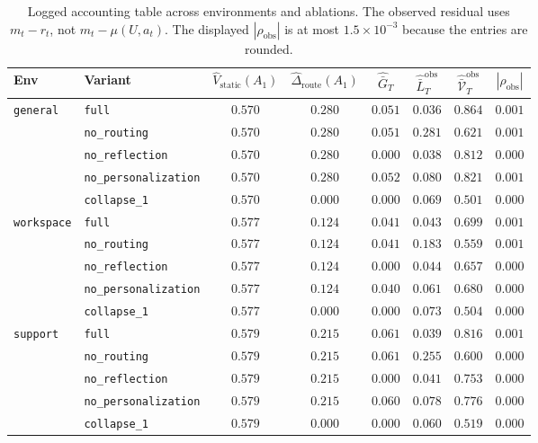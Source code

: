 \documentclass{article} %
\begin{document}
\begin{table}[h]
\centering
\small
\setlength{\tabcolsep}{4pt}
\begin{tabular}{llcccccc}
\toprule
Env & Variant & $\widehat V_{\mathrm{static}}(A_1)$ & $\widehat\Delta_{\mathrm{route}}(A_1)$ & $\widehat{\bar G}_T$ & $\widehat{\bar L}_T^{\mathrm{obs}}$ & $\widehat{\bar{\mathcal V}}_T^{\mathrm{obs}}$ & $|\rho_{\mathrm{obs}}|$ \\
\midrule
\multirow{5}{*}{\texttt{general}}
 & \texttt{full}                & $0.570$ & $0.280$ & $0.051$ & $0.036$ & $0.864$ & $0.001$ \\
 & \texttt{no\_routing}         & $0.570$ & $0.280$ & $0.051$ & $0.281$ & $0.621$ & $0.001$ \\
 & \texttt{no\_reflection}      & $0.570$ & $0.280$ & $0.000$ & $0.038$ & $0.812$ & $0.000$ \\
 & \texttt{no\_personalization} & $0.570$ & $0.280$ & $0.052$ & $0.080$ & $0.821$ & $0.001$ \\
 & \texttt{collapse\_1}         & $0.570$ & $0.000$ & $0.000$ & $0.069$ & $0.501$ & $0.000$ \\
\midrule
\multirow{5}{*}{\texttt{workspace}}
 & \texttt{full}                & $0.577$ & $0.124$ & $0.041$ & $0.043$ & $0.699$ & $0.001$ \\
 & \texttt{no\_routing}         & $0.577$ & $0.124$ & $0.041$ & $0.183$ & $0.559$ & $0.001$ \\
 & \texttt{no\_reflection}      & $0.577$ & $0.124$ & $0.000$ & $0.044$ & $0.657$ & $0.000$ \\
 & \texttt{no\_personalization} & $0.577$ & $0.124$ & $0.040$ & $0.061$ & $0.680$ & $0.000$ \\
 & \texttt{collapse\_1}         & $0.577$ & $0.000$ & $0.000$ & $0.073$ & $0.504$ & $0.000$ \\
\midrule
\multirow{5}{*}{\texttt{support}}
 & \texttt{full}                & $0.579$ & $0.215$ & $0.061$ & $0.039$ & $0.816$ & $0.001$ \\
 & \texttt{no\_routing}         & $0.579$ & $0.215$ & $0.061$ & $0.255$ & $0.600$ & $0.000$ \\
 & \texttt{no\_reflection}      & $0.579$ & $0.215$ & $0.000$ & $0.041$ & $0.753$ & $0.000$ \\
 & \texttt{no\_personalization} & $0.579$ & $0.215$ & $0.060$ & $0.078$ & $0.776$ & $0.000$ \\
 & \texttt{collapse\_1}         & $0.579$ & $0.000$ & $0.000$ & $0.060$ & $0.519$ & $0.000$ \\
\bottomrule
\end{tabular}
\caption{Logged accounting table across environments and ablations. The
observed residual uses \(m_t-r_t\), not \(m_t-\mu(U,a_t)\). The displayed
\(|\rho_{\mathrm{obs}}|\) is at most \(1.5\times10^{-3}\) because the entries
are rounded.}
\label{tab:app-decomp-full}
\end{table}
\end{document}
